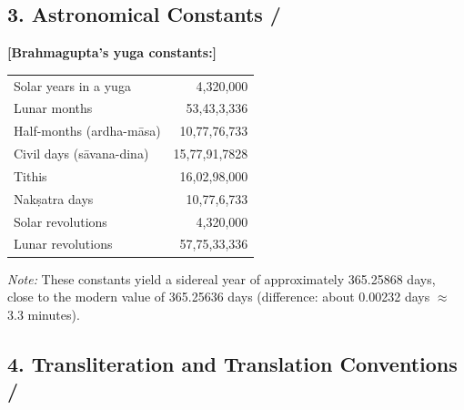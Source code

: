 \documentclass[10pt,a4paper]{article}
\begin{document}
\vspace{1.5em}

\subsection*{3. Astronomical Constants / }

\begin{minipage}[t]{0.47\textwidth}
\end{minipage}%
\hfill\vline\hfill%
\begin{minipage}[t]{0.47\textwidth}
\textbf{[Brahmagupta's yuga constants:]}
\begin{tabular}{@{}lr@{}}
Solar years in a yuga & 4,320,000 \\
Lunar months & 53,43,3,336 \\
Half-months (ardha-māsa) & 10,77,76,733 \\
Civil days (sāvana-dina) & 15,77,91,7828 \\
Tithis & 16,02,98,000 \\
Nakṣatra days & 10,77,6,733 \\
Solar revolutions & 4,320,000 \\
Lunar revolutions & 57,75,33,336 \\
\end{tabular}

\vspace{1em}
\textit{Note:} These constants yield a sidereal year of approximately 365.25868 days,
close to the modern value of 365.25636 days (difference: about 0.00232 days $\approx$ 3.3 minutes).
\end{minipage}

\vspace{1.5em}

\subsection*{4. Transliteration and Translation Conventions / }
\end{document}
